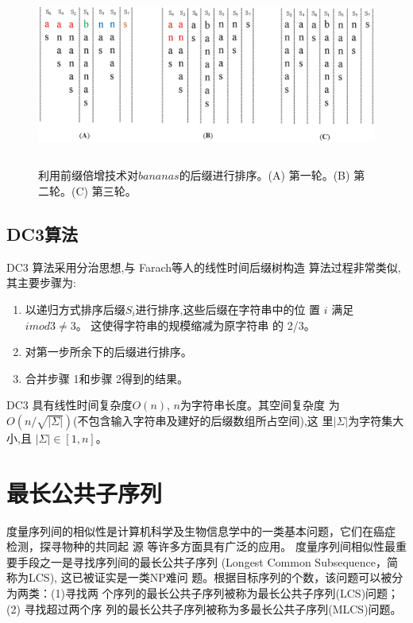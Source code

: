 \begin{figure}[H]
  \centering
  \includegraphics[height=6cm ,width=15cm]{figures/1_Introduction/Prefix_Doubling.eps}
  \caption{利用前缀倍增技术对$bananas$的后缀进行排序。(A) 第一轮。(B) 第二轮。(C) 第三轮。}
  \label{fig:Prefix_Doubling}
\end{figure}

\subsection{DC3算法}
\label{sec:KA}

DC3 算法采用分治思想,与 Farach\cite{Farach1997}等人的线性时间后缀树构造
算法过程非常类似,其主要步骤为:

\begin{enumerate}
\item 以递归方式排序后缀$S_i$进行排序,这些后缀在字符串中的位
  置 $i$ 满足 $i mod 3 \neq 3$。 这使得字符串的规模缩减为原字符串
  的 2/3。
\item 对第一步所余下的后缀进行排序。
\item 合并步骤 1和步骤 2得到的结果。
\end{enumerate}

DC3 具有线性时间复杂度$O(n)$, $n$为字符串长度。其空间复杂度
为 $O(n/\sqrt{|\Sigma|})$(不包含输入字符串及建好的后缀数组所占空间),这
里$|\Sigma|$为字符集大小,且 $|\Sigma| \in [1, n]$。


\section{最长公共子序列}

度量序列间的相似性是计算机科学及生物信息学中的一类基本问题，它们在癌症
检测\cite{Aravanis2017,Chattopadhyay2016,Munday2017}，探寻物种的共同起
源 \cite{Zvelebil2007,Perry2015,Donnell2015} 等许多方面具有广泛的应用。
度量序列间相似性最重要手段之一是寻找序列间的最长公共子序列 (Longest
Common Subsequence，简称为LCS), 这已被证实是一类NP难问
题\cite{Maier1978}。根据目标序列的个数，该问题可以被分为两类：(1)寻找两
个序列的最长公共子序列被称为最长公共子序列(LCS)问题；(2) 寻找超过两个序
列的最长公共子序列被称为多最长公共子序列(MLCS)问题。

